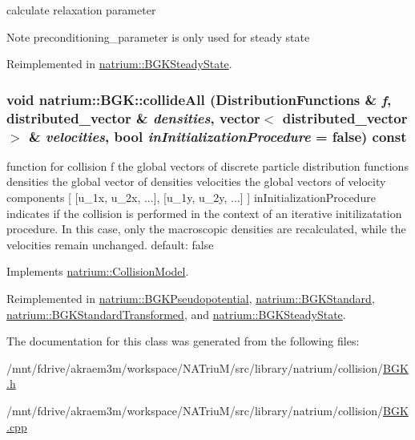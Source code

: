calculate relaxation parameter \begin{DoxyNote}{Note}
preconditioning\_\-parameter is only used for steady state 
\end{DoxyNote}


Reimplemented in \hyperlink{classnatrium_1_1BGKSteadyState_a2cd6628c71475663e204656147de99b8}{natrium::BGKSteadyState}.\hypertarget{classnatrium_1_1BGK_ae5e97a4995fe927e9042a6cffac80acc}{
\subsubsection[{collideAll}]{\setlength{\rightskip}{0pt plus 5cm}void natrium::BGK::collideAll ({\bf DistributionFunctions} \& {\em f}, \/  distributed\_\-vector \& {\em densities}, \/  vector$<$ distributed\_\-vector $>$ \& {\em velocities}, \/  bool {\em inInitializationProcedure} = {\ttfamily false}) const}}
\label{classnatrium_1_1BGK_ae5e97a4995fe927e9042a6cffac80acc}


function for collision f the global vectors of discrete particle distribution functions densities the global vector of densities velocities the global vectors of velocity components \mbox{[} \mbox{[}u\_\-1x, u\_\-2x, ...\mbox{]}, \mbox{[}u\_\-1y, u\_\-2y, ...\mbox{]} \mbox{]} inInitializationProcedure indicates if the collision is performed in the context of an iterative initilizatation procedure. In this case, only the macroscopic densities are recalculated, while the velocities remain unchanged. default: false 

Implements \hyperlink{classnatrium_1_1CollisionModel}{natrium::CollisionModel}.

Reimplemented in \hyperlink{classnatrium_1_1BGKPseudopotential_ac52de8933fa8fbd8a8aa2a3a978f0f4b}{natrium::BGKPseudopotential}, \hyperlink{classnatrium_1_1BGKStandard_a58ffede8b7587e584875ab8e4279fcac}{natrium::BGKStandard}, \hyperlink{classnatrium_1_1BGKStandardTransformed_a00c806c32f16e518117c818a29c2fef4}{natrium::BGKStandardTransformed}, and \hyperlink{classnatrium_1_1BGKSteadyState_a21eda1096ed5c75672b338a75f49d2cc}{natrium::BGKSteadyState}.

The documentation for this class was generated from the following files:\begin{DoxyCompactItemize}
\item 
/mnt/fdrive/akraem3m/workspace/NATriuM/src/library/natrium/collision/\hyperlink{BGK_8h}{BGK.h}\item 
/mnt/fdrive/akraem3m/workspace/NATriuM/src/library/natrium/collision/\hyperlink{BGK_8cpp}{BGK.cpp}\end{DoxyCompactItemize}
